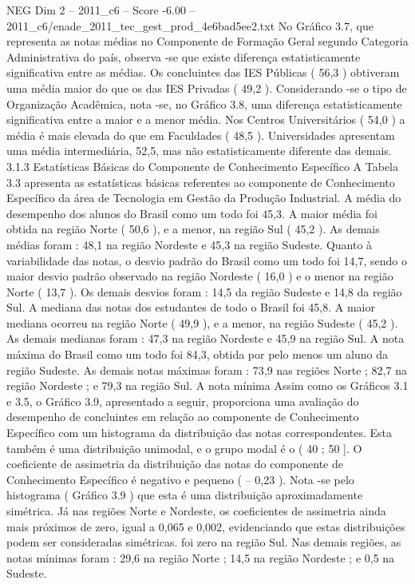 \begin{textsample}{NEG Dim 2 – 2011\_c6 – Score -6.00 – 2011\_c6/enade\_2011\_tec\_gest\_prod\_4e6bad5ee2.txt}
No Gráfico 3.7, que representa as notas médias no Componente de Formação Geral segundo Categoria Administrativa do país, observa -se que existe diferença estatisticamente significativa entre as médias.
Os concluintes das IES Públicas ( 56,3 ) obtiveram uma média maior do que os das IES Privadas ( 49,2 ).
Considerando -se o tipo de Organização Acadêmica, nota -se, no Gráfico 3.8, uma diferença estatisticamente significativa entre a maior e a menor média.
Nos Centros Universitários ( 54,0 ) a média é mais elevada do que em Faculdades ( 48,5 ).
Universidades apresentam uma média intermediária, 52,5, mas não estatisticamente diferente das demais. 3.1.3 Estatísticas Básicas do Componente de Conhecimento Específico A Tabela 3.3 apresenta as estatísticas básicas referentes ao componente de Conhecimento Específico da área de Tecnologia em Gestão da Produção Industrial.
A média do desempenho dos alunos do Brasil como um todo foi 45,3.
A maior média foi obtida na região Norte ( 50,6 ), e a menor, na região Sul ( 45,2 ).
As demais médias foram : 48,1 na região Nordeste e 45,3 na região Sudeste.
Quanto à variabilidade das notas, o desvio padrão do Brasil como um todo foi 14,7, sendo o maior desvio padrão observado na região Nordeste ( 16,0 ) e o menor na região Norte ( 13,7 ).
Os demais desvios foram : 14,5 da região Sudeste e 14,8 da região Sul.
A mediana das notas dos estudantes de todo o Brasil foi 45,8.
A maior mediana ocorreu na região Norte ( 49,9 ), e a menor, na região Sudeste ( 45,2 ).
As demais medianas foram : 47,3 na região Nordeste e 45,9 na região Sul.
A nota máxima do Brasil como um todo foi 84,3, obtida por pelo menos um aluno da região Sudeste.
As demais notas máximas foram : 73,9 nas regiões Norte ; 82,7 na região Nordeste ; e 79,3 na região Sul.
A nota mínima Assim como os Gráficos 3.1 e 3.5, o Gráfico 3.9, apresentado a seguir, proporciona uma avaliação do desempenho de concluintes em relação ao componente de Conhecimento Específico com um histograma da distribuição das notas correspondentes.
Esta também é uma distribuição unimodal, e o grupo modal é o ( 40 ; 50 ].
O coeficiente de assimetria da distribuição das notas do componente de Conhecimento Específico é negativo e pequeno ( – 0,23 ).
Nota -se pelo histograma ( Gráfico 3.9 ) que esta é uma distribuição aproximadamente simétrica.
Já nas regiões Norte e Nordeste, os coeficientes de assimetria ainda mais próximos de zero, igual a 0,065 e 0,002, evidenciando que estas distribuições podem ser consideradas simétricas. foi zero na região Sul.
Nas demais regiões, as notas mínimas foram : 29,6 na região Norte ; 14,5 na região Nordeste ; e 0,5 na Sudeste.

\end{textsample}
